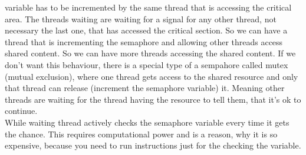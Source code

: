 \documentclass[a4paper]{article}
\begin{document}
variable has to be incremented by the same thread that is accessing the critical area. The threads
waiting are waiting for a signal for any other thread, not necessary the last one, that has accessed
the critical section. So we can have a thread that is incrementing the semaphore and allowing
other threads access shared content. So we can have more threads accessing the shared content. 
If we don't want this behaviour, there is a special type of a sempahore called
mutex (mutual exclusion), where one thread gets access to the shared resource and only that thread
can release (increment the semaphore variable) it. Meaning other threads are waiting for 
the thread having the resource to tell them, that it's ok to continue.
\\
While waiting thread actively checks the semaphore variable every time it gets the chance. This 
requires computational power and is a reason, why it is so expensive, because you need to run 
instructions just for the checking the variable.
\end{document}
